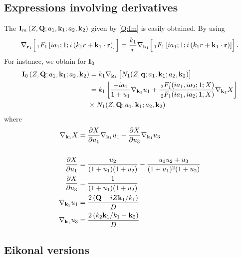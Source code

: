 \subsection{Expressions involving derivatives}
The $\mathbf{I}_{m} \left(Z, \mathbf{Q}; a_{1}, \mathbf{k}_{1} ; a_{2}, \mathbf{k}_{2}
\right) $ given by \ref{Q:Im} is easily obtained. By using
%
\[
\nabla_{\mathbf{r}_{1}} \Big[ \,{_{1}F_{1}} \left[ i a_{1} ; 1 ;i
\left(k_{1} r + \mathbf{k}_{1}\cdot \mathbf{r} \right)\right] \Big] =
\frac{k_{1}}{r} \nabla_{\mathbf{k}_{1}}\Bigl[\,_{1}F_{1} \left[ i
a_{1} ; 1 ;i \left(k_{1} r + \mathbf{k}_{1}\cdot \mathbf{r} \right)\right]
\Bigr] \, .
\]
%
For instance, we obtain for $\mathbf{I}_{0}$
%
\begin{align*}
\vect{I}_{0} \left(Z, \vect{Q}; a_{1}, \vect{k}_{1} ; a_{2}, \vect{k}_{2}
\right) &= k_{1} \nabla_{\vect{k}_{1}} \left[ N_{1}(Z,\vect{q};
a_{1},\vect{k}_{1}; a_{2},\vect{k}_{2})  \vstretch \right]
\\
&= k_{1}  \left[ \frac{-i a_{1}}{1 + u_{1}} \nabla_{\vect{k}_{1}}
u_{1}  + \frac{\,{_{2}F'_{1}}(i a_{1}, i a_{2}; 1;
X)}{\,{_{2}F_{1}}(i a_{1}, i a_{2}; 1; X)} \nabla_{\vect{k}_{1}} X
\right] \nonumber
\\
& {\times} \; N_{1}(Z,\vect{Q}; a_{1},\vect{k}_{1}; a_{2},\vect{k}_{2})
\end{align*}
%
where
\begin{align*}
\nabla_{\mathbf{k}_{1}} X &= \frac{\partial X}{\partial u_{1}}
\nabla_{\mathbf{k}_{1}} u_{1} + \frac{\partial X}{\partial u_{3}}
\nabla_{\mathbf{k}_{1}} u_{3}
 \\
\\
\frac{\partial X}{\partial u_{1}}  &= \frac{u_{2}}{ ( 1 + u_{1}) (1 +
u_{2})} - \frac{u_{1} u_{2} + u_{3}}{(1 + u_{1})^{2} (1 + u_{2})}
\nonumber \\
\frac{\partial X}{\partial u_{3}}  &= \frac{1}{ ( 1 + u_{1})
(1 + u_{2})} \nonumber \\
\nabla_{\mathbf{k}_{1}} u_{1} &=\frac{2\left( \mathbf{Q} - i Z \mathbf{k}_{1}
/k_{1} \right)}{D}
\nonumber \\
\nabla_{\mathbf{k}_{1}} u_{3} &= \frac{2 \left( k_{2} \mathbf{k}_{1}/k_{1} -
\mathbf{k}_{2} \right)}{D} \nonumber
\end{align*}

\subsection{Eikonal versions}



